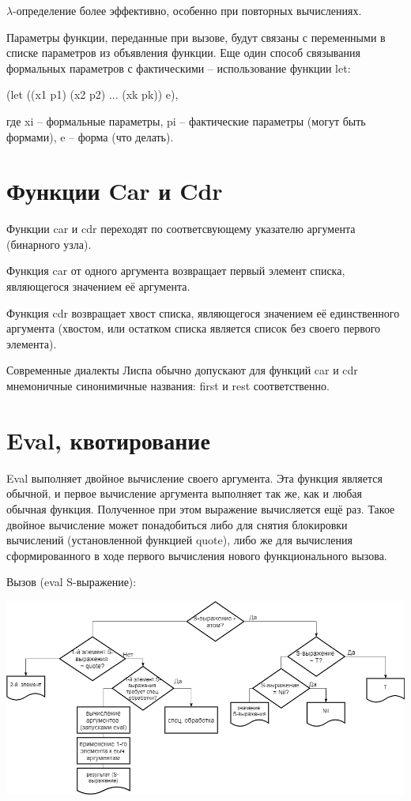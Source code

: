 \documentclass{article}
\begin{document}
$\lambda$-определение более эффективно, особенно при повторных вычислениях. 

Параметры функции, переданные при вызове, будут связаны с переменными в списке параметров из объявления функции. Еще один способ связывания формальных параметров с фактическими -- использование функции let:

(let ((x1 p1) (x2 p2) ... (xk pk))  e),

где xi -- формальные параметры, pi -- фактические параметры (могут быть формами), e -- форма (что делать).

\section*{Функции Car и Cdr}

Функции car и cdr переходят по соответсвующему указателю аргумента (бинарного узла).

Функция car от одного аргумента возвращает первый элемент списка, являющегося значением её аргумента. 

Функция cdr возвращает хвост списка, являющегося значением её единственного аргумента (хвостом, или остатком списка является список  без своего первого элемента).  

Современные диалекты  Лиспа обычно допускают для функций car и cdr мнемоничные синонимичные названия: first и rest соответственно.



 

\section*{Eval, квотирование}

Eval выполняет двойное  вычисление своего аргумента. Эта функция является обычной, и первое  вычисление аргумента выполняет так же, как и любая обычная функция.  Полученное при этом выражение вычисляется ещё раз. Такое двойное  вычисление может понадобиться либо для снятия блокировки вычислений (установленной функцией quote), либо же для вычисления сформированного в ходе первого вычисления нового функционального вызова.

Вызов (eval S-выражение):

\includegraphics[scale=0.5]{img/eval}
\end{document}
